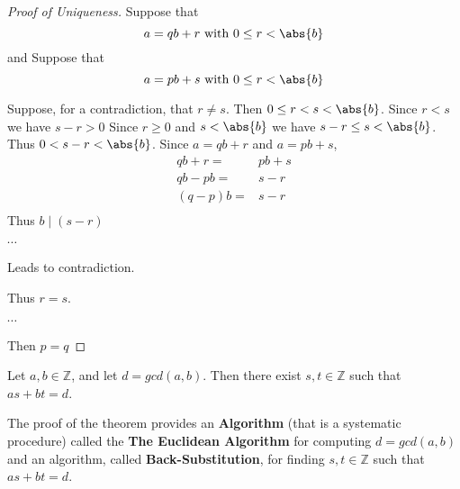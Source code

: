 \begin{proof}[Proof of Uniqueness]
Suppose that \[a = qb + r \text{ with } 0\leq r < \abs{b}\] and 
Suppose that \[a = pb + s \text{ with } 0\leq r < \abs{b}\]

Suppose, for a contradiction, that $r\neq s$. 
Then $0\leq r < s < \abs{b}$.
Since $r<s$ we have $s-r > 0$
Since $r\geq 0$ and $s<\abs{b}$ we have $s-r \leq s < \abs{b}$.
Thus $0<s-r < \abs{b}$.
Since $a=qb+r$ and $a=pb+s$, \begin{align*}
    qb+r =& pb + s\\
    qb - pb =& s-r\\
    (q-p) b = & s - r \\
\end{align*}
Thus $b\mid (s-r)$

$\cdots$

Leads to contradiction.

Thus $r = s$.

$\cdots$

Then $p = q$
\end{proof}






\begin{thm}
Let $a,b\in \mathbb{Z}$, and let $d = gcd(a,b)$. Then there exist $s,t\in\mathbb{Z}$ such that $as+bt = d$.
\end{thm}

The proof of the theorem provides an \textbf{Algorithm} (that is a systematic procedure) called the \textbf{The Euclidean Algorithm} for computing $d = gcd(a,b)$ and an algorithm, called \textbf{Back-Substitution}, for finding $s,t\in\mathbb{Z}$ such that $as+bt = d$.